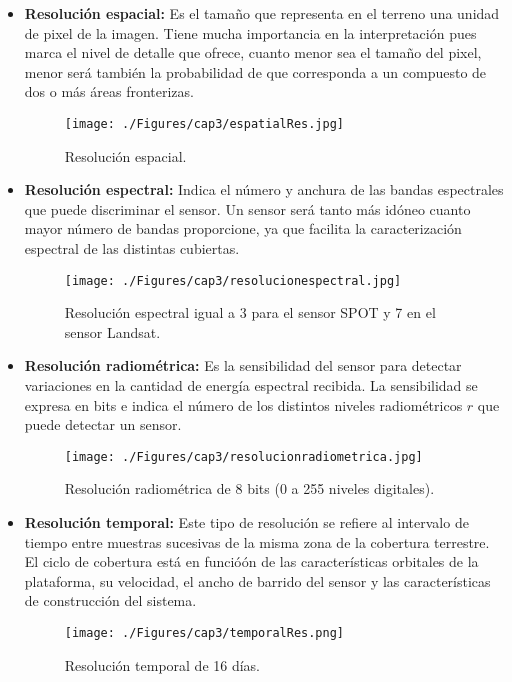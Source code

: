 \begin{itemize}
		\item \textbf{Resolución espacial:} Es el tamaño que representa en el terreno una unidad de pixel de la imagen. Tiene mucha importancia en la interpretaci\'on pues marca el nivel de detalle que ofrece, cuanto menor sea el tama\~{n}o del pixel, menor ser\'a tambi\'en la probabilidad de que corresponda a un compuesto de dos o m\'as \'areas fronterizas.
		\begin{figure}[H]
			\centering
			\texttt{[image: ./Figures/cap3/espatialRes.jpg]}
			\caption{Resoluci\'on espacial.}
			\label{fig:espatialRes}
		\end{figure}
			\item \textbf{Resoluci\'on espectral:} Indica el n\'umero y anchura de las bandas espectrales que puede discriminar el sensor. Un sensor ser\'a tanto m\'as id\'oneo cuanto mayor n\'umero de bandas proporcione, ya que facilita la caracterizaci\'on espectral de las distintas cubiertas.
				\begin{figure}[H]
					\centering
					\texttt{[image: ./Figures/cap3/resolucionespectral.jpg]}
					\caption{Resoluci\'on espectral igual a 3 para el sensor SPOT y 7 en el sensor Landsat.}
					\label{fig:espectralRes}
				\end{figure}
		\item \textbf{Resoluci\'on radiom\'etrica:} Es la sensibilidad del sensor para detectar variaciones en la cantidad de energ\'ia espectral recibida. La sensibilidad se expresa en bits e indica el n\'umero de los distintos niveles radiom\'etricos $ r $ que puede detectar un sensor.
						\begin{figure}[H]
							\centering
							\texttt{[image: ./Figures/cap3/resolucionradiometrica.jpg]}
							\caption{Resoluci\'on radiom\'etrica de 8 bits (0 a 255 niveles digitales).}
							\label{fig:radioRes}
						\end{figure}
		\item \textbf{Resoluci\'on temporal:} Este tipo de resoluci\'on se refiere al intervalo de tiempo entre muestras sucesivas de la misma zona de la cobertura terrestre. El ciclo de cobertura est\'a en funció\'on de las caracter\'isticas orbitales de la plataforma, su velocidad, el ancho de barrido del sensor y las caracter\'isticas de construcci\'on del sistema.
			\begin{figure}[H]
					\centering
					\texttt{[image: ./Figures/cap3/temporalRes.png]}
					\caption{Resoluci\'on temporal de 16 d\'ias.}
					\label{fig:temporaRes}
				\end{figure}
		

		
	\end{itemize}

